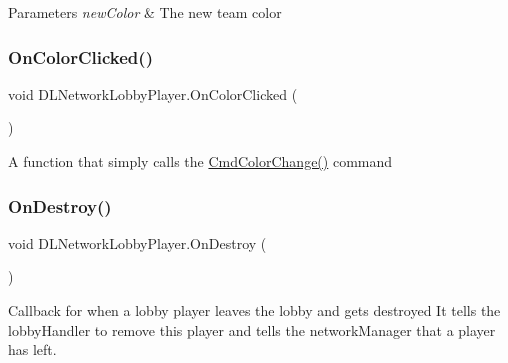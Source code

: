 \begin{DoxyParams}{Parameters}
{\em new\+Color} & The new team color\\
\hline
\end{DoxyParams}
\hypertarget{class_d_l_network_lobby_player_aab20faf1b2912c913363f9664c5f57f4}{}\label{class_d_l_network_lobby_player_aab20faf1b2912c913363f9664c5f57f4} 
\subsubsection{\texorpdfstring{On\+Color\+Clicked()}{OnColorClicked()}}
{\footnotesize\ttfamily void D\+L\+Network\+Lobby\+Player.\+On\+Color\+Clicked (\begin{DoxyParamCaption}{ }\end{DoxyParamCaption})}



A function that simply calls the \hyperlink{class_d_l_network_lobby_player_a53746df370122d632c01e627d97e2d4c}{Cmd\+Color\+Change()} command 

\hypertarget{class_d_l_network_lobby_player_a63135a20581f45c883b629debf4e70ef}{}\label{class_d_l_network_lobby_player_a63135a20581f45c883b629debf4e70ef} 
\subsubsection{\texorpdfstring{On\+Destroy()}{OnDestroy()}}
{\footnotesize\ttfamily void D\+L\+Network\+Lobby\+Player.\+On\+Destroy (\begin{DoxyParamCaption}{ }\end{DoxyParamCaption})}



Callback for when a lobby player leaves the lobby and gets destroyed It tells the lobby\+Handler to remove this player and tells the network\+Manager that a player has left. 

\hypertarget{class_d_l_network_lobby_player_af59e1193d1aea8384751952f693302c2}{}\label{class_d_l_network_lobby_player_af59e1193d1aea8384751952f693302c2} 

